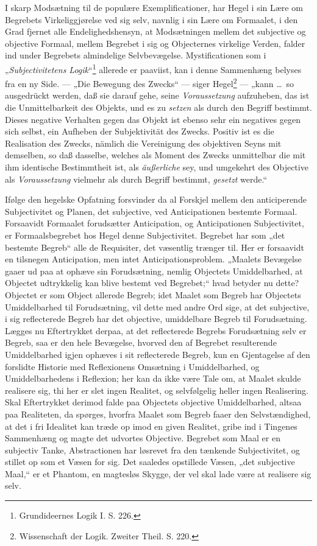 \documentclass[12pt]{book}
\newcommand{\opage}[1]{\marginnote{\footnotesize\textit{[#1]}}}
\begin{document}
I skarp Modsætning til de populære Exemplificationer,
har Hegel i sin Lære om Begrebets Virkeliggjørelse ved sig
selv, navnlig i sin Lære om Formaalet, i den Grad fjernet
alle Endelighedshensyn, at Modsætningen mellem det subjective
og objective Formaal, mellem Begrebet i sig og Objecternes
virkelige Verden, falder ind under Begrebets almindelige
Selvbevægelse. Mystificationen som i „\emph{Subjectivitetens
Logik}“\footnote{Grundideernes Logik I. S. 226.} %
allerede er paaviist, kan i denne Sammenhæng
belyses fra en ny Side. --- „Die Bewegung des Zwecks“ ---
siger Hegel\footnote{Wissenschaft der Logik. Zweiter Theil. S. 220.} %
--- „kann \dots\ so ausgedrückt werden, daß sie
darauf gehe, seine \emph{Voraussetzung} aufzuheben, das ist die
Unmittelbarkeit des Objekts, und es zu \emph{setzen} als durch den
Begriff bestimmt. Dieses negative Verhalten gegen das Objekt
ist ebenso sehr ein negatives gegen sich selbst, ein Aufheben
der Subjektivität des Zwecks. Positiv ist es die Realisation
des Zwecks, nämlich die Vereinigung des objektiven
Seyns mit demselben, so daß dasselbe, welches als Moment
des Zwecks unmittelbar die mit ihm identische Bestimmtheit
ist, als \emph{äußerliche} sey, und umgekehrt des Objective als %
\emph{Voraussetzung} vielmehr als durch Begriff bestimmt, \emph{gesetzt} werde.“

Ifølge den hegelske Opfatning forsvinder da al Forskjel
mellem den anticiperende Subjectivitet og Planen, det subjective,
ved Anticipationen bestemte Formaal. Forsaavidt Formaalet
forudsætter Anticipation, og Anticipationen Subjectivitet,
er Formaalsbegrebet hos Hegel denne Subjectivitet. Begrebet
har som „det bestemte Begreb“ alle de Requisiter, det
\opage{131}væsentlig trænger til. Her er forsaavidt en tilsnegen Anticipation,
men intet Anticipationsproblem. „Maalets Bevægelse
gaaer ud paa at ophæve sin Forudsætning, nemlig Objectets
Umiddelbarhed, at Objectet udtrykkelig kan blive bestemt ved
Begrebet;“ hvad betyder nu dette? Objectet er som Object
allerede Begreb; idet Maalet som Begreb har Objectets
Umiddelbarhed til Forudsætning, vil dette med andre Ord
sige, at det subjective, i sig reflecterede Begreb har det objective,
umiddelbare Begreb til Forudsætning. Lægges nu Eftertrykket
derpaa, at det reflecterede Begrebs Forudsætning selv
er Begreb, saa er den hele Bevægelse, hvorved den af Begrebet
resulterende Umiddelbarhed igjen ophæves i sit reflecterede
Begreb, kun en Gjentagelse af den forslidte Historie
med Reflexionens Omsætning i Umiddelbarhed, og Umiddelbarhedens
i Reflexion; her kan da ikke være Tale om, at
Maalet skulde realisere sig, thi her er slet ingen Realitet, og
selvfølgelig heller ingen Realisering. Skal Eftertrykket derimod
falde paa Objectets objective Umiddelbarhed, altsaa paa
Realiteten, da spørges, hvorfra Maalet som Begreb faaer den
Selvstændighed, at det i fri Idealitet kan træde op imod en
given Realitet, gribe ind i Tingenes Sammenhæng og magte
det udvortes Objective. Begrebet som Maal er en subjectiv
Tanke, Abstractionen har løsrevet fra den tænkende Subjectivitet,
og stillet op som et Væsen for sig. Det saaledes
opstillede Væsen, „det subjective Maal,“ er et Phantom, en
magtesløs Skygge, der vel skal lade være at realisere sig selv.
\end{document}
